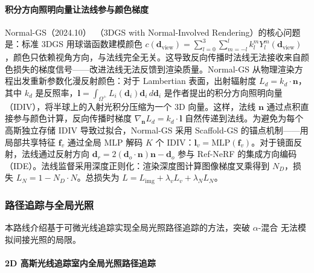 \paragraph{积分方向照明向量让法线参与颜色梯度}

Normal-GS（2024.10）~\cite{2410_20593}（3DGS with Normal-Involved Rendering）的核心问题是：标准 3DGS 用球谐函数建模颜色 $c(\mathbf{d}_{\text{view}}) = \sum_{l=0}^{3}\sum_{m=-l}^{l} k_l^m Y_l^m(\mathbf{d}_{\text{view}})$，颜色只依赖视角方向，与法线完全无关。这导致反向传播时法线无法接收来自颜色损失的梯度信号——改进法线无法反馈到渲染质量。Normal-GS 从物理渲染方程出发重新参数化漫反射颜色：对于 Lambertian 表面，出射辐射度 $L_d = k_d \cdot \mathbf{n}$，其中 $k_d$ 是反照率，$\mathbf{l} = \int_{\Omega^+} L_i(\mathbf{d}_i) \mathbf{d}_i \, d\mathbf{d}_i$ 是作者提出的积分方向照明向量（IDIV），将半球上的入射光积分压缩为一个 3D 向量。这样，法线 $\mathbf{n}$ 通过点积直接参与颜色计算，反向传播时梯度 $\nabla_{\mathbf{n}} L_d = k_d \cdot \mathbf{l}$ 自然传递到法线。为避免为每个高斯独立存储 IDIV 导致过拟合，Normal-GS 采用 Scaffold-GS 的锚点机制——用局部共享特征 $\mathbf{f}_v$ 通过全局 MLP 解码 $K$ 个 IDIV：$\mathbf{l}_v = \text{MLP}(\mathbf{f}_v)$。对于镜面反射，法线通过反射方向 $\mathbf{d}_r = 2(\mathbf{d}_o \cdot \mathbf{n})\mathbf{n} - \mathbf{d}_o$ 参与 Ref-NeRF 的集成方向编码（IDE）。法线监督采用深度正则化：渲染深度图计算图像梯度叉乘得到 $N_D$，损失 $L_N = 1 - N_D \cdot N$。总损失为 $L = L_{\text{img}} + \lambda_v L_v + \lambda_N L_N$。

\subsubsection{路径追踪与全局光照}

本路线介绍基于可微光线追踪实现全局光照路径追踪的方法，突破 $\alpha$-混合 无法模拟间接光照的局限。

\paragraph{2D 高斯光线追踪室内全局光照路径追踪}

